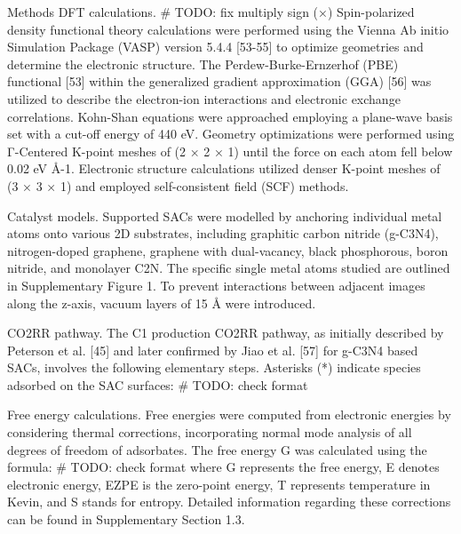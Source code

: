 Methods
DFT calculations.
# TODO: fix multiply sign (×)
Spin-polarized density functional theory calculations were performed using the Vienna Ab initio Simulation Package (VASP) version 5.4.4 [53-55] to optimize geometries and determine the electronic structure. The Perdew-Burke-Ernzerhof (PBE) functional [53] within the generalized gradient approximation (GGA) [56] was utilized to describe the electron-ion interactions and electronic exchange correlations. Kohn-Shan equations were approached employing a plane-wave basis set with a cut-off energy of 440 eV. Geometry optimizations were performed using Γ-Centered K-point meshes of (2 × 2 × 1) until the force on each atom fell below 0.02 eV Å-1. Electronic structure calculations utilized denser K-point meshes of (3 × 3 × 1) and employed self-consistent field (SCF) methods.


Catalyst models.
Supported SACs were modelled by anchoring individual metal atoms onto various 2D substrates, including graphitic carbon nitride (g-C3N4), nitrogen-doped graphene, graphene with dual-vacancy, black phosphorous, boron nitride, and monolayer C2N. The specific single metal atoms studied are outlined in Supplementary Figure 1. To prevent interactions between adjacent images along the z-axis, vacuum layers of 15 Å were introduced.


CO2RR pathway.
The C1 production CO2RR pathway, as initially described by Peterson et al. [45] and later confirmed by Jiao et al. [57] for g-C3N4 based SACs, involves the following elementary steps. Asterisks (*) indicate species adsorbed on the SAC surfaces:
# TODO: check format


Free energy calculations.
Free energies were computed from electronic energies by considering thermal corrections, incorporating normal mode analysis of all degrees of freedom of adsorbates. The free energy G was calculated using the formula:
# TODO: check format
where G represents the free energy, E denotes electronic energy, EZPE is the zero-point energy, T represents temperature in Kevin, and S stands for entropy. Detailed information regarding these corrections can be found in Supplementary Section 1.3.

